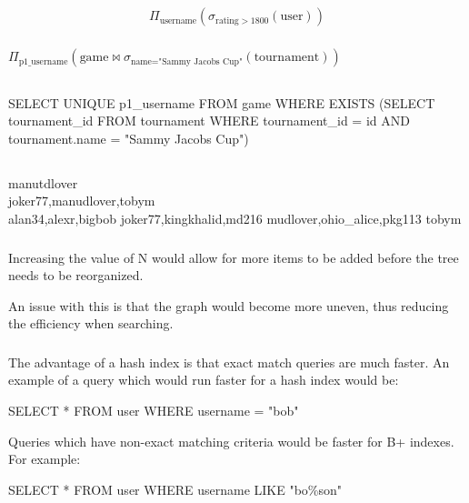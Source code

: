 \documentclass[11pt]{article}
\begin{document}
\subsection{}

\subsubsection{}

$$\Pi_{\text{username}}(\sigma_{\text{rating} > 1800}(\text{user}))$$

\subsubsection{}

$\Pi_{\text{p1\_username}}(\text{game} \Join \sigma_{\text{name} = \text{"Sammy Jacobs Cup"}}(\text{tournament}))$

\subsection{}

SELECT UNIQUE p1\_username FROM game WHERE EXISTS (SELECT tournament\_id FROM tournament
WHERE tournament\_id = id AND tournament.name = "Sammy Jacobs Cup")

\subsection{}

\subsubsection{}

manutdlover \\

joker77,manudlover,tobym \\

alan34,alexr,bigbob joker77,kingkhalid,md216 mudlover,ohio\_alice,pkg113 tobym  \\

\subsubsection{}

Increasing the value of N would allow for more items to be added before the
tree needs to be reorganized. 

An issue with this is that the graph would become more uneven, thus reducing
the efficiency when searching.

\subsubsection{}

The advantage of a hash index is that exact match queries are much faster. An
example of a query which would run faster for a hash index would be:

SELECT * FROM user WHERE username = "bob"

Queries which have non-exact matching criteria would be faster for B+ indexes.
For example:

SELECT * FROM user WHERE username LIKE "bo\%son"
\end{document}
